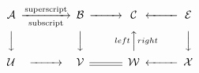 \documentclass{book}
\begin{document}
\[
\begin{CD}
\mathcal{A} @>{\rm superscript}>{\rm
subscript}> \mathcal{B} @>>>
\mathcal{C}@<<< \mathcal{E}\\
@VVV @VVV @A{left}A{right}A @VVV\\
\mathcal{U} @>>> \mathcal{V} @=
\mathcal{W}@<<< \mathcal{X}
\end{CD}
\]
\end{document}
